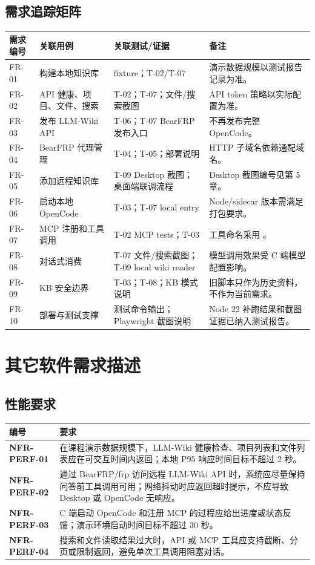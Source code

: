 \documentclass[UTF8,a4paper,12pt,fontset=fandol]{ctexart}
\newcommand{\code}[1]{\texorpdfstring{\begingroup\footnotesize\detokenize{#1}\endgroup}{#1}}
\begin{document}
\subsection{需求追踪矩阵}
\begin{longtable}{>{\centering\arraybackslash}p{1.6cm}p{3.6cm}p{4.8cm}p{4.2cm}}
\toprule
需求编号 & 关联用例 & 关联测试/证据 & 备注 \\
\midrule
FR-01 & 构建本地知识库 & \code{sample-wiki} fixture；T-02/T-07 & 演示数据规模以测试报告记录为准。 \\
FR-02 & API 健康、项目、文件、搜索 & T-02；T-07；文件/搜索截图 & API token 策略以实际配置为准。 \\
FR-03 & 发布 LLM-Wiki API & T-06；T-07 BearFRP 发布入口 & 不再发布完整 OpenCode。 \\
FR-04 & BearFRP 代理管理 & T-04；T-05；部署说明 & HTTP 子域名依赖通配域名。 \\
FR-05 & 添加远程知识库 & T-09 Desktop 截图；桌面端联调流程 & Desktop 截图编号见第 5 章。 \\
FR-06 & 启动本地 OpenCode & T-03；T-07 local entry & Node/sidecar 版本需满足打包要求。 \\
FR-07 & MCP 注册和工具调用 & T-02 MCP tests；T-03 & 工具命名采用 \code{llm_wiki_*}。 \\
FR-08 & 对话式消费 & T-07 文件/搜索截图；T-09 local wiki reader & 模型调用效果受 C 端模型配置影响。 \\
FR-09 & KB 安全边界 & T-03；T-08；KB 模式说明 & 旧脚本只作为历史资料，不作为当前需求。 \\
FR-10 & 部署与测试支撑 & 测试命令输出；Playwright 截图说明 & Node 22 补跑结果和截图证据已纳入测试报告。 \\
\bottomrule
\end{longtable}

\section{其它软件需求描述}

\subsection{性能要求}
\begin{longtable}{>{\bfseries}p{3.0cm}p{11.2cm}}
\toprule
编号 & 要求 \\
\midrule
NFR-PERF-01 & 在课程演示数据规模下，LLM-Wiki 健康检查、项目列表和文件列表应在可交互时间内返回；本地 P95 响应时间目标不超过 2 秒。 \\
NFR-PERF-02 & 通过 BearFRP/frp 访问远程 LLM-Wiki API 时，系统应尽量保持问答前工具调用可用；网络抖动时应返回超时提示，不应导致 Desktop 或 OpenCode 无响应。 \\
NFR-PERF-03 & C 端启动 OpenCode 和注册 MCP 的过程应给出进度或状态反馈；演示环境启动时间目标不超过 30 秒。 \\
NFR-PERF-04 & 搜索和文件读取结果过大时，API 或 MCP 工具应支持截断、分页或限制返回，避免单次工具调用阻塞对话。 \\
\bottomrule
\end{longtable}
\end{document}
